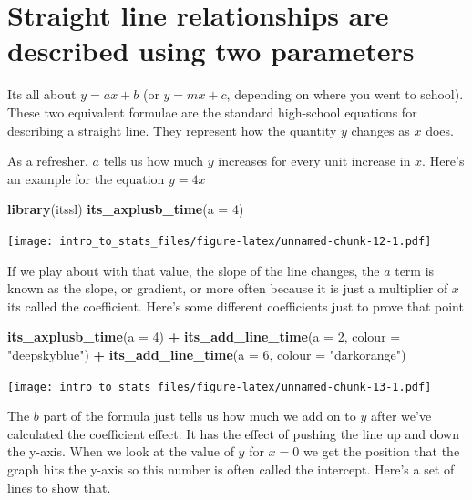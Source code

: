 \documentclass[
]{book}
\newenvironment{Shaded}{\begin{snugshade}}{\end{snugshade}}
\newcommand{\DataTypeTok}[1]{\textcolor[rgb]{0.13,0.29,0.53}{#1}}
\newcommand{\DecValTok}[1]{\textcolor[rgb]{0.00,0.00,0.81}{#1}}
\newcommand{\KeywordTok}[1]{\textcolor[rgb]{0.13,0.29,0.53}{\textbf{#1}}}
\newcommand{\NormalTok}[1]{#1}
\newcommand{\OperatorTok}[1]{\textcolor[rgb]{0.81,0.36,0.00}{\textbf{#1}}}
\newcommand{\StringTok}[1]{\textcolor[rgb]{0.31,0.60,0.02}{#1}}
\begin{document}
\hypertarget{straight-line-relationships-are-described-using-two-parameters}{%
\section{Straight line relationships are described using two parameters}\label{straight-line-relationships-are-described-using-two-parameters}}

Its all about \(y = ax + b\) (or \(y = mx + c\), depending on where you went to school). These two equivalent formulae are the standard high-school equations for describing a straight line. They represent how the quantity \(y\) changes as \(x\) does.

As a refresher, \(a\) tells us how much \(y\) increases for every unit increase in \(x\). Here's an example for the equation \(y = 4x\)

\begin{Shaded}
\begin{Highlighting}[]
\KeywordTok{library}\NormalTok{(itssl)}
\KeywordTok{its_axplusb_time}\NormalTok{(}\DataTypeTok{a =} \DecValTok{4}\NormalTok{)}
\end{Highlighting}
\end{Shaded}

\texttt{[image: intro\_to\_stats\_files/figure-latex/unnamed-chunk-12-1.pdf]}

If we play about with that value, the slope of the line changes, the \(a\) term is known as the slope, or gradient, or more often because it is just a multiplier of \(x\) its called the coefficient. Here's some different coefficients just to prove that point

\begin{Shaded}
\begin{Highlighting}[]
\KeywordTok{its_axplusb_time}\NormalTok{(}\DataTypeTok{a =} \DecValTok{4}\NormalTok{) }\OperatorTok{+}
\StringTok{  }\KeywordTok{its_add_line_time}\NormalTok{(}\DataTypeTok{a =} \DecValTok{2}\NormalTok{, }\DataTypeTok{colour =} \StringTok{"deepskyblue"}\NormalTok{) }\OperatorTok{+}
\StringTok{  }\KeywordTok{its_add_line_time}\NormalTok{(}\DataTypeTok{a =} \DecValTok{6}\NormalTok{, }\DataTypeTok{colour =} \StringTok{"darkorange"}\NormalTok{)}
\end{Highlighting}
\end{Shaded}

\texttt{[image: intro\_to\_stats\_files/figure-latex/unnamed-chunk-13-1.pdf]}

The \(b\) part of the formula just tells us how much we add on to \(y\) after we've calculated the coefficient effect. It has the effect of pushing the line up and down the y-axis. When we look at the value of \(y\) for \(x = 0\) we get the position that the graph hits the y-axis so this number is often called the intercept. Here's a set of lines to show that.
\end{document}
